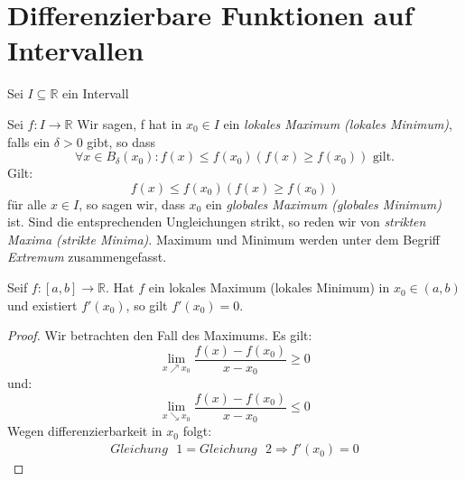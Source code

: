 \section{Differenzierbare Funktionen auf Intervallen}
Sei $I \subseteq \mathbb{R}$ ein Intervall
\begin{Definition}{
	Sei $f: I \rightarrow \mathbb{R}$ Wir sagen, f hat in $x_0 \in I$ ein 
	\emph{lokales Maximum (lokales Minimum)}, falls ein $\delta > 0$ gibt,
	so dass 
	\begin{equation*}
	\forall x \in B_\delta(x_0) : f(x) \leq f(x_0) (f(x) \geq f(x_0)) \text{ gilt.}
	\end{equation*}
	Gilt:
	\begin{equation*}
		f(x) \leq f(x_0) (f(x) \geq f(x_0))
	\end{equation*}
	 für alle $x \in I$, so sagen wir, dass 
	$x_0$ ein \emph{globales Maximum (globales Minimum)} ist.
	Sind die entsprechenden Ungleichungen strikt, so reden wir von 
	\emph{strikten Maxima (strikte Minima)}. Maximum und Minimum werden unter dem 
	Begriff \emph{Extremum} zusammengefasst.
}\end{Definition}

\begin{Satz}{
	\label{satz_8}
	Seif $f:[a,b] \rightarrow \mathbb{R}$. Hat $f$ ein lokales Maximum (lokales 
	Minimum) in $x_0 \in (a,b)$ und existiert $f'(x_0)$, so gilt 
	$f'(x_0) = 0$.
}\end{Satz}

\begin{proof}
	Wir betrachten den Fall des Maximums.
	Es gilt:
	\begin{equation*}
		\label{gleichung:bedingungi}
		\lim\limits_{x \nearrow x_0}{ \frac{f(x)-f(x_0)}{x-x_0} \geq 0}
	\end{equation*}
	und:
	\begin{equation*}
		\label{gleichung:bedingungii}
		\lim\limits_{x \searrow x_0}{\frac{f(x)-f(x_0)}{x-x_0} \leq 0}
	\end{equation*}
	Wegen differenzierbarkeit in $x_0$ folgt:
	\begin{align*}
		Gleichung\text{ }1 = Gleichung \text{ }2 \Rightarrow 
		f'(x_0) = 0
	\end{align*}	
\end{proof}